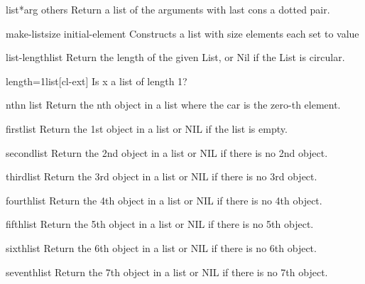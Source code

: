 \documentclass[10pt,english]{book}
\begin{document}
\begin{function}{list*}{arg \rest others}
  Return a list of the arguments with last cons a dotted pair.
\end{function}

\begin{function}{make-list}{size \key initial-element}
  Constructs a list with size elements each set to value
\end{function}

\begin{function}{list-length}{list}
  Return the length of the given List, or Nil if the List is circular.
\end{function}

\begin{function}{length=1}{list}[cl-ext]
  Is x a list of length 1?
\end{function}

\begin{accessor}{nth}{n list}
  Return the nth object in a list where the car is the zero-th element.
\end{accessor}

\begin{accessor}{first}{list}
  Return the 1st object in a list or NIL if the list is empty.
\end{accessor}

\begin{accessor}{second}{list}
  Return the 2nd object in a list or NIL if there is no 2nd object.
\end{accessor}

\begin{accessor}{third}{list}
  Return the 3rd object in a list or NIL if there is no 3rd object.
\end{accessor}

\begin{accessor}{fourth}{list}
  Return the 4th object in a list or NIL if there is no 4th object.
\end{accessor}

\begin{accessor}{fifth}{list}
  Return the 5th object in a list or NIL if there is no 5th object.
\end{accessor}

\begin{accessor}{sixth}{list}
  Return the 6th object in a list or NIL if there is no 6th object.
\end{accessor}

\begin{accessor}{seventh}{list}
  Return the 7th object in a list or NIL if there is no 7th object.
\end{accessor}
\end{document}
